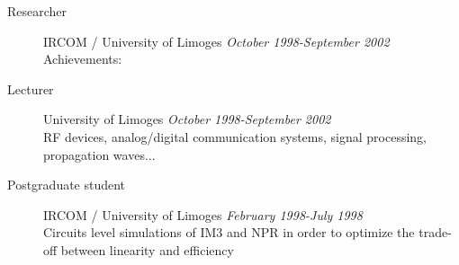 \documentclass[margin,line]{resume}
\begin{document}
\begin{resume}
\begin{description}
        \item[Researcher]\small{IRCOM / University of Limoges \hfill
          \textsl{October 1998-September 2002}}\\
          Achievements:
          \vspace{2mm}

        \item[Lecturer]\small{University of Limoges \hfill
          \textsl{October 1998-September 2002}}\\
          RF devices, analog/digital communication systems, signal
          processing, propagation waves...
          \vspace{2mm}

        \item[Postgraduate student]\small{IRCOM / University of Limoges
          \hfill \textsl{February 1998-July 1998}}\\
          Circuits level simulations of IM3 and NPR in order to
          optimize the trade-off between linearity and efficiency

      \end{description}

    \end{resume}
    
\end{document}
